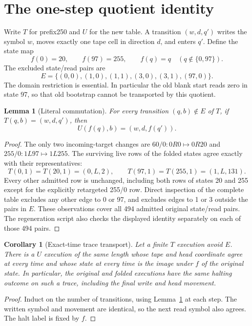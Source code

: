 \documentclass[11pt]{article}
\newtheorem{lemma}{Lemma}
\newtheorem{corollary}{Corollary}
\begin{document}
\section{The one-step quotient identity}

Write $T$ for prefix250 and $U$ for the new table. A transition
$(w,d,q')$ writes the symbol $w$, moves exactly one tape cell in direction
$d$, and enters $q'$. Define the state map
\[
 f(0)=20,\qquad f(97)=255,\qquad f(q)=q\quad(q\notin\{0,97\}).
\]
The excluded state/read pairs are
\[
 E=\{(0,0),(1,0),(1,1),(3,0),(3,1),(97,0)\}.
\]
The domain restriction is essential. In particular the old blank start
reads zero in state 97, so that old bootstrap cannot be transported by
this quotient.

\begin{lemma}[Literal commutation]\label{lem:commute}
For every transition $(q,b)\notin E$ of $T$, if
$T(q,b)=(w,d,q')$, then
\[
 U(f(q),b)=(w,d,f(q')).
\]
\end{lemma}
\begin{proof}
The only two incoming-target changes are
$60/0:0R0\mapsto0R20$ and $255/0:1L97\mapsto1L255$.
The surviving live rows of the folded states agree exactly with their
representatives:
\[
 T(0,1)=T(20,1)=(0,L,2),\qquad
 T(97,1)=T(255,1)=(1,L,131).
\]
Every other admitted row is unchanged, including both rows of states 20
and 255 except for the explicitly retargeted 255/0 row. Direct inspection
of the complete table excludes any other edge to 0 or 97, and excludes
edges to 1 or 3 outside the pairs in $E$. These observations cover all
494 admitted original state/read pairs. The regeneration script also
checks the displayed identity separately on each of those 494 pairs.
\end{proof}

\begin{corollary}[Exact-time trace transport]\label{cor:trace}
Let a finite $T$ execution avoid $E$. There is a $U$ execution of the same
length whose tape and head coordinate agree at every time and whose state
at every time is the image under $f$ of the original state. In particular,
the original and folded executions have the same halting outcome on such
a trace, including the final write and head movement.
\end{corollary}
\begin{proof}
Induct on the number of transitions, using Lemma~\ref{lem:commute} at
each step. The written symbol and movement are identical, so the next
read symbol also agrees. The halt label is fixed by $f$.
\end{proof}
\end{document}
